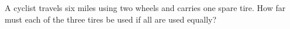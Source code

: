 A cyclist travels six miles using two wheels and carries one spare tire. How far must each of the three tires be used if all are used equally?
